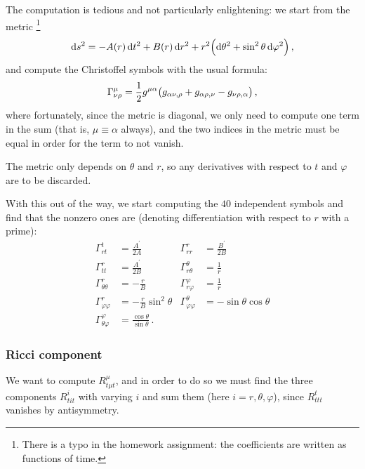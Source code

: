 \documentclass[main.tex]{subfiles}
\begin{document}
The computation is tedious and not particularly enlightening: we start from the metric
\footnote{There is a typo in the homework assignment: the coefficients are written as functions of time.}
%
\begin{align}
  \dd{s^2} = - A(r) \dd{t^2}
  + B(r) \dd{r^2}
  + r^2 \qty(\dd{\theta^2} + \sin^2\theta \dd{\varphi^2})
\,,
\end{align}
%
and compute the Christoffel symbols with the usual formula: 
%
\begin{align}
  \Gamma^{\mu }_{\nu \rho } =
  \frac{1}{2} g^{\mu \alpha }\qty(g_{\alpha \nu , \rho }
  + g_{\alpha \rho, \nu } - g_{\nu \rho , \alpha })
\,,
\end{align}
%
where fortunately, since the metric is diagonal, we only need to compute one term in the sum (that is, \(\mu \equiv \alpha \) always), and the two indices in the metric must be equal in order for the term to not vanish. 

The metric only depends on \(\theta \) and \(r\), so any derivatives with respect to \(t\) and \(\varphi \) are to be discarded. 

With this out of the way, we start computing the \(40\) independent symbols and find that the nonzero ones are (denoting differentiation with respect to \(r\) with a prime): 
%
\begin{subequations}
\begin{align}
  \Gamma^{t}_{rt} &= \frac{A^{\prime }}{2A}  &
  \Gamma^{r}_{rr} &= \frac{B^{\prime }}{2B}  \\
  \Gamma^{r}_{tt} &= \frac{A^{\prime }}{2B}  &
  \Gamma^{\theta }_{r \theta } &= \frac{1}{r}  \\
  \Gamma^{r}_{\theta \theta } &= -\frac{r}{B}  &
  \Gamma^{\varphi }_{r \varphi } &= \frac{1}{r}  \\
  \Gamma^{r}_{\varphi \varphi } &= - \frac{r}{B} \sin^2 \theta  &
  \Gamma^{\theta }_{\varphi \varphi } &= - \sin \theta \cos \theta  \\
  \Gamma^{\varphi }_{\theta \varphi } &= \frac{\cos \theta }{\sin \theta }
\,.
\end{align}
\end{subequations}

\subsubsection{Ricci component}

We want to compute \(R^{\mu }_{t \mu t }\), and in order to do so we must find the three components \(R^{i}_{tit}\) with varying \(i\) and sum them (here \(i = r, \theta,\varphi \)), since \(R^{t}_{ttt}\) vanishes by antisymmetry. 
\end{document}
